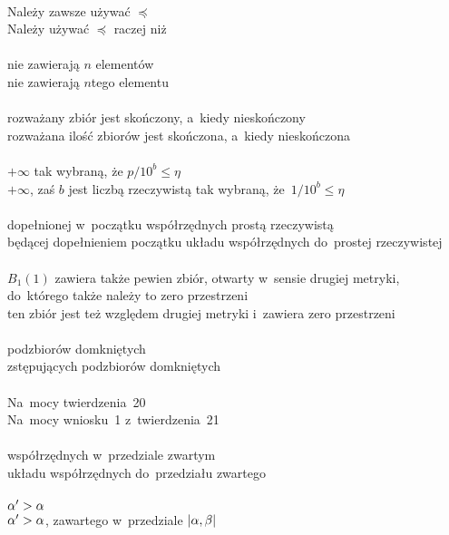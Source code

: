 \documentclass[a4paper,11pt]{article}
\begin{document}
\noi
{} \\
\Jest Należy zawsze używać $\preceq$ \\
\Pow  Należy używać $\preceq$ raczej niż \\
 \\
\Jest nie zawierają $n$ elementów \\
\Pow  nie zawierają $n$\dywiz tego elementu \\
 \\
\Jest rozważany zbiór jest skończony, a~kiedy nieskończony \\
\Pow  rozważana ilość zbiorów jest skończona, a~kiedy nieskończona \\
 \\
\Jest $+\infty$ tak wybraną, że $p / 10^{ b } \leq \eta$ \\
$+\infty$, zaś $b$ jest liczbą rzeczywistą tak wybraną,
że~$1 / 10^{ b } \leq \eta$ \\
 \\
\Jest dopełnionej w~początku współrzędnych prostą rzeczywistą \\
\Pow będącej dopełnieniem początku układu współrzędnych do~prostej
rzeczywistej \\
 \\
\Jest $B_{ 1 }( 1 )$ zawiera także pewien zbiór, otwarty w~sensie
drugiej
metryki, do~którego także należy to zero przestrzeni \\
\Pow ten zbiór jest też względem drugiej metryki i~zawiera zero
przestrzeni \\ %
 \\
\Jest podzbiorów domkniętych \\
\Pow  zstępujących podzbiorów domkniętych \\
 \\
\Jest Na~mocy twierdzenia~20 \\
\Pow  Na~mocy wniosku~1 z~twierdzenia~21 \\
 \\
\Jest współrzędnych w~przedziale zwartym \\
\Pow  układu współrzędnych do~przedziału zwartego \\
 \\
\Jest $\alpha' > \alpha$ \\
\Pow  $\alpha' > \alpha$, zawartego w~przedziale $| \alpha, \beta |$ \\
 \\
\end{document}
